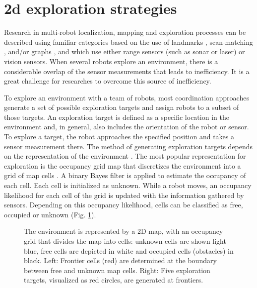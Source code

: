\section{2d exploration strategies}

Research in multi-robot localization, mapping and exploration processes can be described using familiar categories based on the use of landmarks \cite{Dedeoglu2000}, scan-matching \cite{Burgard2000}, and/or graphs \cite{Rekeleitis2000}, and
which use either range sensors (such as sonar or laser) or vision
sensors. When several robots explore an environment, there is a considerable overlap of the sensor measurements that leads to inefficiency. It is a great challenge for researches to overcome this source of inefficiency. 

To explore an environment with a team of robots, most coordination approaches generate a set of possible exploration targets and assign robots to a subset of those targets. An
exploration target is defined as a specific location in the environment and, in general, also includes the orientation of the robot or sensor. To explore a target, the robot approaches the specified position and takes a sensor measurement there. The method of generating exploration targets depends on the representation of the environment \cite{Wurm2012}. 
The most popular representation for exploration is the occupancy grid map that discretizes the environment into a grid of map cells \cite{Moravec}. A binary Bayes filter is applied to estimate the occupancy of each cell. Each cell is initialized as unknown.  While a robot moves, an occupancy likelihood for each cell of the grid is updated with the information gathered by sensors. Depending on this occupancy likelihood, cells can be classified as free, occupied or unknown (Fig. \ref{fig:environment}).

\begin{figure}[t!]
	\centering
	\caption {The environment is represented by a 2D map, with an occupancy grid that divides the map into cells: unknown cells are shown light blue, free cells are depicted in white and occupied cells (obstacles) in black. Left: Frontier cells (red) are determined at the boundary between free and unknown map cells. Right: Five exploration targets, visualized as red circles, are generated at frontiers. \cite{Wurm2012}}
	\label{fig:environment}
\end{figure}


